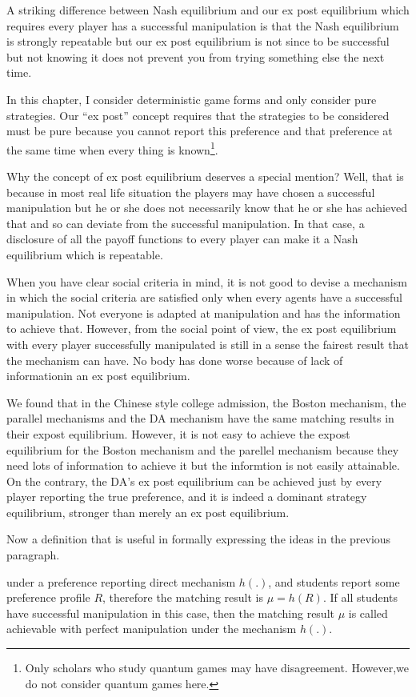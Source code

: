 A striking difference between Nash equilibrium and our ex post equilibrium which requires every player has a successful manipulation is that the Nash equilibrium is strongly repeatable but our ex post equilibrium is not since to be successful but not knowing it does not prevent you from trying something else the next time.


In this chapter, I consider deterministic game forms and only consider pure strategies. Our ``ex post'' concept requires that the strategies to be considered must be pure because you cannot report this preference and that preference at the same time when every thing is known\footnote{Only scholars who study quantum games may have disagreement. However,we do not consider quantum games here.}.

Why the concept of ex post equilibrium  deserves a special mention? Well, that is because in most real life situation the players may have chosen a successful manipulation but he or she does not necessarily know that he or she has achieved that and so can deviate from the successful manipulation. In that case, a disclosure of all the payoff functions to every player can make it a Nash equilibrium which is repeatable.   


 
When you have clear social criteria in mind, it is not good to devise a mechanism in which the social criteria are satisfied only when every agents have a successful manipulation. Not everyone 
is adapted at manipulation and has the information to achieve that. However, from the social point of view, the ex post equilibrium with every player successfully manipulated is still in a sense the fairest result that the mechanism can have. No body has done worse because of lack of informationin an ex post equilibrium.


We found that in the Chinese style college admission, the Boston mechanism, the parallel mechanisms and the DA mechanism have the same matching results in their expost equilibrium. However, it is not 
easy to achieve the expost equilibrium for the Boston mechanism and the parellel mechanism because they need lots of information to achieve it but the informtion is not easily attainable. On the contrary, the DA's ex post equilibrium can be achieved just by every player reporting the true preference, and it is indeed a dominant strategy equilibrium, stronger than merely an ex post equilibrium.

Now a definition that is useful in formally expressing the ideas in the previous paragraph.
\begin{definition}
under a preference reporting direct mechanism $h(.)$, and students report some preference profile $R$, therefore the matching result is $\mu=h(R)$.
If all students have successful manipulation in this case, then the matching result $\mu$ is called achievable with perfect manipulation under the mechanism $h(.)$.
\end{definition}

